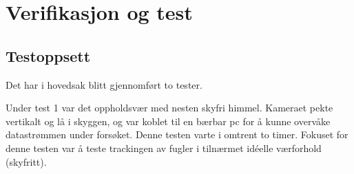 \section{Verifikasjon og test} 
\label{sec:verifikasjon}

\subsection{Testoppsett}\label{sec:verifikasjon:oppsett}

Det har i hovedsak blitt gjennomført to tester. 

Under test 1 var det oppholdsvær med nesten skyfri himmel. Kameraet pekte vertikalt og lå i skyggen, og var koblet til en bærbar pc for å kunne overvåke datastrømmen under forsøket. Denne testen varte i omtrent to timer. Fokuset for denne testen var å teste trackingen av fugler i tilnærmet idéelle værforhold (skyfritt).



